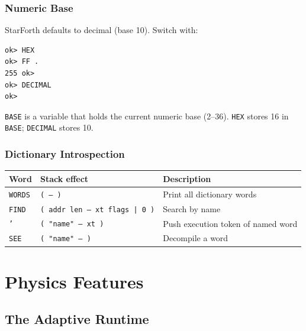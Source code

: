 \section{Numeric Base}
\label{sec:numeric-base}

StarForth defaults to decimal (base 10). Switch with:

\begin{lstlisting}[language=Forth]
ok> HEX
ok> FF .
255 ok>
ok> DECIMAL
ok>
\end{lstlisting}

\texttt{BASE} is a variable that holds the current numeric base (2--36).
\texttt{HEX} stores 16 in \texttt{BASE}; \texttt{DECIMAL} stores 10.

\section{Dictionary Introspection}
\label{sec:introspection}

\begin{center}
\begin{tabular}{lll}
\toprule
Word & Stack effect & Description \\
\midrule
\texttt{WORDS}  & \texttt{( -- )} & Print all dictionary words \\
\texttt{FIND}   & \texttt{( addr len -- xt flags | 0 )} & Search by name \\
\texttt{'}      & \texttt{( "name" -- xt )} & Push execution token of named word \\
\texttt{SEE}    & \texttt{( "name" -- )} & Decompile a word \\
\bottomrule
\end{tabular}
\end{center}

\part{Physics Features}

\chapter{The Adaptive Runtime}
\label{chap:physics}

